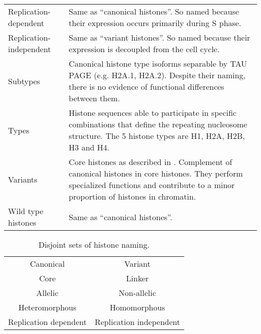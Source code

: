 \begin{table*}
\begin{tabular}{F p{\dimexpr(\textwidth--4\tabcolsep)}}
      Replication-dependent &
      Same as ``canonical histones''.  So named because their expression
      occurs primarily during S phase. \\
      \addlinespace

      Replication-independent &
      Same as ``variant histones''.  So named because their expression is
      decoupled from the cell cycle. \\
      \addlinespace

      Subtypes &
      Canonical histone type isoforms separable by TAU PAGE
      (e.g. H2A.1, H2A.2).  Despite their naming, there is no evidence of
      functional differences between them. \\
      \addlinespace

      Types &
      Histone sequences able to participate in specific combinations
      that define the repeating nucleosome structure.
      The 5 histone types are H1, H2A, H2B, H3 and H4.\\
      \addlinespace

      Variants &
      Core histones as described in .
      Complement of canonical histones in core histones.  They perform
      specialized functions and contribute to a minor proportion of
      histones in chromatin. \\
      \addlinespace

      Wild type histones &
      Same as ``canonical histones''. \\
      \bottomrule
    \end{tabular}
  \end{table*}

  \begin{table*}
    \caption{Disjoint sets of histone naming.}
    \label{tab:histone-disjoint-sets}
    \centering
    \begin{tabular}{c@{ and }c}
      \toprule
      Canonical & Variant \\
      Core & Linker \\
      Allelic & Non-allelic \\
      Heteromorphous & Homomorphous \\
      Replication dependent & Replication independent \\
      \bottomrule
    \end{tabular}
  \end{table*}
